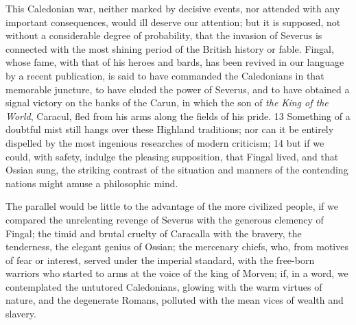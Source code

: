 
This Caledonian war, neither marked by decisive events, nor
attended with any important consequences, would ill deserve our
attention; but it is supposed, not without a considerable degree
of probability, that the invasion of Severus is connected with
the most shining period of the British history or fable. Fingal,
whose fame, with that of his heroes and bards, has been revived
in our language by a recent publication, is said to have
commanded the Caledonians in that memorable juncture, to have
eluded the power of Severus, and to have obtained a signal
victory on the banks of the Carun, in which the son of \textit{the King
of the World}, Caracul, fled from his arms along the fields of
his pride. 13 Something of a doubtful mist still hangs over these
Highland traditions; nor can it be entirely dispelled by the most
ingenious researches of modern criticism; 14 but if we could,
with safety, indulge the pleasing supposition, that Fingal lived,
and that Ossian sung, the striking contrast of the situation and
manners of the contending nations might amuse a philosophic mind.

The parallel would be little to the advantage of the more
civilized people, if we compared the unrelenting revenge of
Severus with the generous clemency of Fingal; the timid and
brutal cruelty of Caracalla with the bravery, the tenderness, the
elegant genius of Ossian; the mercenary chiefs, who, from motives
of fear or interest, served under the imperial standard, with the
free-born warriors who started to arms at the voice of the king
of Morven; if, in a word, we contemplated the untutored
Caledonians, glowing with the warm virtues of nature, and the
degenerate Romans, polluted with the mean vices of wealth and
slavery.



